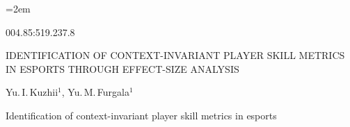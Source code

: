 %
%


\makeatletter{}\makeatother
\newcommand{\ab}{\allowbreak}
\newcommand{\us}{\_\allowbreak}
\emergencystretch=2em
\setcounter{topnumber}{3}\setcounter{bottomnumber}{2}\setcounter{totalnumber}{4}
\renewcommand{\textfraction}{0.05}\renewcommand{\bottomfraction}{0.7}
\renewcommand{\floatpagefraction}{0.75}


\begin{UdcEng}
004.85:519.237.8
\end{UdcEng}

\begin{Title}
IDENTIFICATION OF CONTEXT-INVARIANT PLAYER SKILL METRICS
IN ESPORTS THROUGH EFFECT-SIZE ANALYSIS
\end{Title}

\begin{Authors}
Yu.\,I.\,Kuzhii$^{1}$, Yu.\,M.\,Furgala$^{1}$
\end{Authors}

{Identification of context-invariant player skill metrics in esports}

